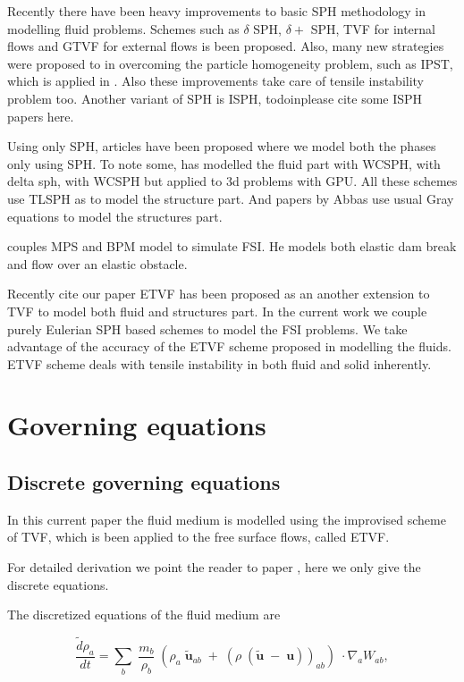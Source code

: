 \documentclass[preprint,12pt]{elsarticle}
\newcommand{\ten}[1]{\ensuremath{\mathbf{#1}}}
\begin{document}
Recently there have been heavy improvements to basic SPH methodology in
modelling fluid problems. Schemes such as $\delta$ SPH, $\delta +$ SPH, TVF
for internal flows and GTVF for external flows is been proposed. Also, many
new strategies were proposed to in overcoming the particle homogeneity
problem, such as IPST, which is applied in \cite{IPST paper}. Also these
improvements take care of tensile instability problem too. Another variant of
SPH is ISPH, todoin{please cite some ISPH papers here}.


Using only SPH, articles have been proposed where we model both the phases
only using SPH. To note some, \citet{He2017coupled} has modelled the fluid
part with WCSPH, \citet{Sun2019study} with delta sph,
\citet{zhan2019stabilized} with WCSPH but applied to 3d problems with GPU. All
these schemes use TLSPH as to model the structure part. And papers by Abbas use
usual Gray equations to model the structures part.

\citet{sun2019fully} couples MPS and BPM model to simulate FSI. He models both
elastic dam break and flow over an elastic obstacle.



Recently {cite our paper ETVF} has been proposed as an another extension to
TVF to model both fluid and structures part. In the current work we couple
purely Eulerian SPH based schemes to model the FSI problems. We take advantage
of the accuracy of the ETVF scheme proposed in modelling the fluids. ETVF
scheme deals with tensile instability in both fluid and solid inherently.




\section{Governing equations}


\subsection{Discrete governing equations}

In this current paper the fluid medium is modelled using the improvised scheme
of TVF, which is been applied to the free surface flows, called ETVF.

For detailed derivation we point the reader to paper \cite{cite our paper},
here we only give the discrete equations.


The discretized equations of the fluid medium are

\begin{equation}
  \label{eq:sph-discretization-continuity}
  \frac{\tilde{d}\rho_a}{dt} = \sum_{b} \; \frac{m_b}{\rho_{b}} \; (
  \rho_{a} \; \tilde{\ten{u}}_{ab} \; + \;
  (\rho \; (\tilde{\ten{u}} \; - \;
  \ten{u}))_{ab}) \; \cdot \nabla_{a} W_{ab},
\end{equation}
\end{document}
